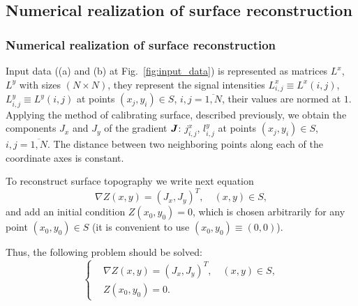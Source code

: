 \documentclass{beamer}
\begin{document}
\subsection{Numerical realization of surface reconstruction}
\begin{frame}[c,allowframebreaks]
    \frametitle{Numerical realization of surface reconstruction}

    Input data ((a) and (b) at Fig.~\ref{fig:input_data}) is represented as matrices $L^x$, $L^y$
    with sizes $(N \times N)$, they represent the signal intensities $L^x_{i,j} \equiv L^x (i,j)$,
    $L^y_{i,j} \equiv L^y (i,j)$ at points $(x_j, y_i) \in S$, $i,j = \overline{1,N}$, their values
    are normed at $1$. Applying the method of calibrating surface, described previously,
    we obtain the components $J_x$ and $J_y$ of the gradient ${\textbf{\emph{J}}}$: $j^x_{i,j}$,
    $l^y_{i,j}$ at points $(x_j, y_i) \in S$, $i,j = \overline{1,N}$.
    The distance between two neighboring points along each of the coordinate axes is constant.

    To reconstruct surface topography we write next equation
    $$ \nabla Z(x,y) = (J_x, J_y)^T, \quad (x,y)\in S,$$
    and add an initial condition $Z(x_0,y_0) = 0$, which is chosen arbitrarily for any point
    $(x_0,y_0) \in S$ (it is convenient to use $(x_0,y_0) \equiv (0,0)$).

    \framebreak

    Thus, the following problem should be solved:
    \begin{equation}
        \label{system_of_equations}
        \left\{
            \begin{aligned}
                &\nabla Z(x,y) = (J_x, J_y)^T, \quad (x,y)\in S, \\
                &Z(x_0,y_0) = 0.
            \end{aligned}
        \right.
    \end{equation}

    \framebreak


\end{frame}
\end{document}
